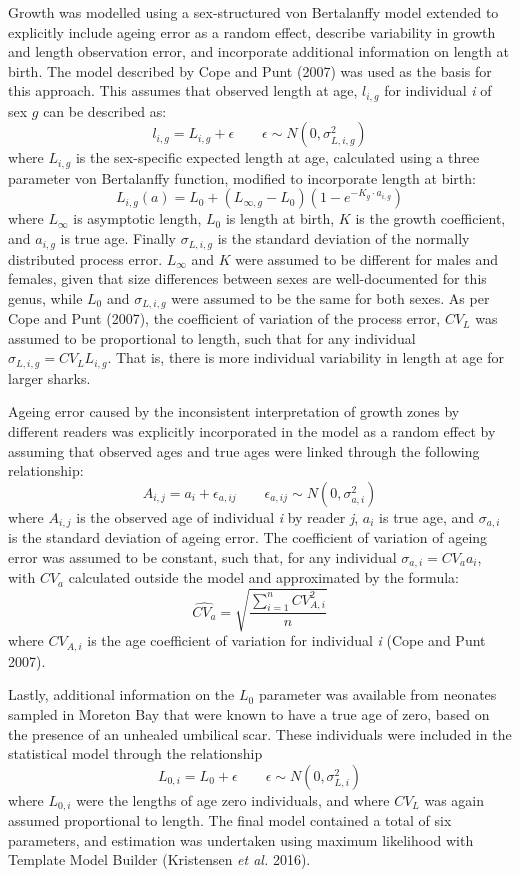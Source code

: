 \documentclass[]{article}
\begin{document}
Growth was modelled using a sex-structured von Bertalanffy model
extended to explicitly include ageing error as a random effect, describe
variability in growth and length observation error, and incorporate
additional information on length at birth. The model described by Cope
and Punt (2007) was used as the basis for this approach. This assumes
that observed length at age, \(l_{i,g}\) for individual \emph{i} of sex
\(g\) can be described as:
\[l_{i,g} = L_{i,g} + \epsilon \quad\quad \epsilon \sim N(0,\sigma_{L,i,g}^2)\]
where \(L_{i,g}\) is the sex-specific expected length at age, calculated
using a three parameter von Bertalanffy function, modified to
incorporate length at birth:
\[L_{i,g}(a) = L_0 + (L_{\infty,g}-L_0)(1-e^{-K_{g}\cdot a_{i,g}})\]
where \(L_\infty\) is asymptotic length, \(L_0\) is length at birth,
\(K\) is the growth coefficient, and \(a_{i,g}\) is true age. Finally
\(\sigma_{L,i,g}\) is the standard deviation of the normally distributed
process error. \(L_\infty\) and \(K\) were assumed to be different for
males and females, given that size differences between sexes are
well-documented for this genus, while \(L_0\) and \(\sigma_{L,i,g}\)
were assumed to be the same for both sexes. As per Cope and Punt (2007),
the coefficient of variation of the process error, \(CV_L\) was assumed
to be proportional to length, such that for any individual
\(\sigma_{L,i,g} = CV_L L_{i,g}\). That is, there is more individual
variability in length at age for larger sharks.

Ageing error caused by the inconsistent interpretation of growth zones
by different readers was explicitly incorporated in the model as a
random effect by assuming that observed ages and true ages were linked
through the following relationship:
\[A_{i,j} = a_i + \epsilon_{a,ij} \quad \quad \epsilon_{a,ij} \sim N(0,\sigma_{a,i}^2)\]
where \(A_{i,j}\) is the observed age of individual \emph{i} by reader
\emph{j}, \(a_i\) is true age, and \(\sigma_{a,i}\) is the standard
deviation of ageing error. The coefficient of variation of ageing error
was assumed to be constant, such that, for any individual
\(\sigma_{a,i} = CV_{a}a_i\), with \(CV_a\) calculated outside the model
and approximated by the formula:
\[\hat{CV_a} = \sqrt{\frac{\sum_{i=1}^{n}CV_{A,i}^2}{n}}\] where
\(CV_{A,i}\) is the age coefficient of variation for individual \emph{i}
(Cope and Punt 2007).

Lastly, additional information on the \(L_0\) parameter was available
from neonates sampled in Moreton Bay that were known to have a true age
of zero, based on the presence of an unhealed umbilical scar. These
individuals were included in the statistical model through the
relationship
\[L_{0,i} = L_0 + \epsilon \quad \quad \epsilon \sim N(0,\sigma_{L,i}^2)\]
where \(L_{0,i}\) were the lengths of age zero individuals, and where
\(CV_L\) was again assumed proportional to length. The final model
contained a total of six parameters, and estimation was undertaken using
maximum likelihood with Template Model Builder (Kristensen \emph{et al.}
2016).
\end{document}
